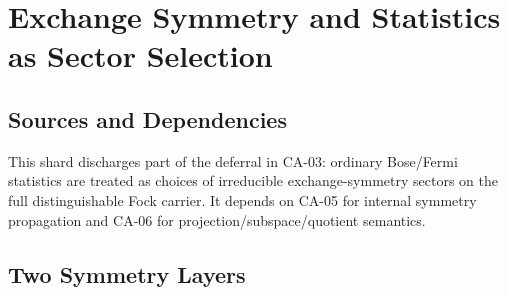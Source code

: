 
\section{Exchange Symmetry and Statistics as Sector Selection}
\label{sec:exchange-statistics-layer}

\subsection{Sources and Dependencies}

This shard discharges part of the deferral in CA-03: ordinary Bose/Fermi
statistics are treated as choices of irreducible exchange-symmetry sectors on
the full distinguishable Fock carrier.  It depends on CA-05 for internal
symmetry propagation and CA-06 for projection/subspace/quotient semantics.


\subsection{Two Symmetry Layers}

